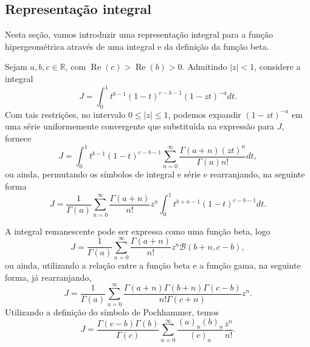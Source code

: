 







\subsection{Representação integral}

Nesta seção, vamos introduzir uma representação integral para a função hipergeométrica através de uma integral e da definição da função beta.

Sejam $a, b, c \in \mathbb{R}$, com $\operatorname{Re}(c) > \operatorname{Re}(b) > 0$. Admitindo $|z| < 1$, considere a integral
$$J = \int_0^1 t^{b-1} (1 - t)^{c-b-1} (1 - zt)^{-a} dt.$$
Com tais restrições, no intervalo $0 \leq |z| \leq 1$, podemos expandir $(1-zt)^{-a}$ em uma série uniformemente convergente que substituída na expressão para $J$, fornece
$$J = \int_0^1 t^{b-1} (1 - t)^{c-b-1}
\sum_{n=0}^{\infty} \dfrac{\Gamma(a + n)(zt)^n}{\Gamma(a) n!} dt,$$
ou ainda, permutando os símbolos de integral e série e rearranjando, na seguinte forma
$$J = \dfrac{1}{\Gamma(a)} \sum_{n=0}^{\infty} \dfrac{\Gamma(a + n)}{n!} z^n
\int_0^1 t^{b+n-1} (1 - t)^{c-b-1} dt.$$

A integral remanescente pode ser expressa como uma função beta, logo
$$J =
\dfrac{1}{\Gamma(a)} \sum_{n=0}^{\infty} \dfrac{\Gamma(a + n)}{n!} z^n \mathcal{B}(b + n, c - b),$$
ou ainda, utilizando a relação entre a função beta e a função gama, na seguinte forma, já rearranjando,
$$J =
\dfrac{1}{\Gamma(a)}
\sum_{n=0}^{\infty}
\dfrac{\Gamma(a + n)\Gamma(b + n)\Gamma(c - b)}{n! \Gamma(c + n)} z^n.$$
Utilizando a definição do símbolo de Pochhammer, temos
$$J = \dfrac{\Gamma(c - b)\Gamma(b)}{\Gamma(c)} \sum_{n=0}^{\infty} \dfrac{(a)_n(b)_n}{(c)_n} \dfrac{z^n}{n!}.
$$


